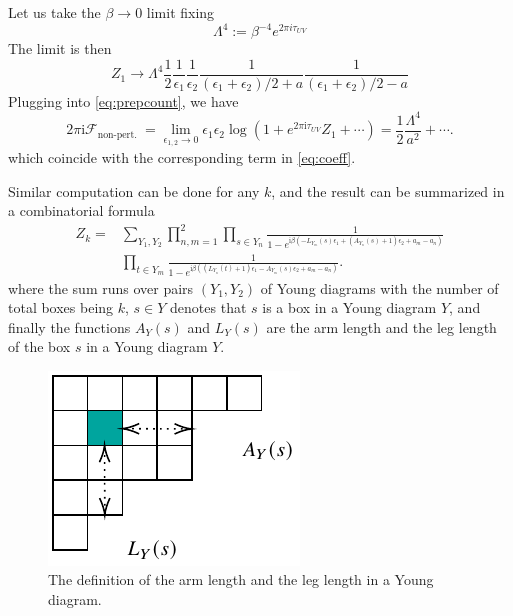 \documentclass{article}
\begin{document}
Let us take the $\beta\to 0$ limit fixing
\begin{equation}
\Lambda^{4}:=\beta^{-4} e^{2 \pi i \tau_{U V}}
\end{equation}
The limit is then
\begin{equation}
Z_{1} \rightarrow \Lambda^{4} \frac{1}{2} \frac{1}{\epsilon_{1}} \frac{1}{\epsilon_{2}} \frac{1}{\left(\epsilon_{1}+\epsilon_{2}\right) / 2+a} \frac{1}{\left(\epsilon_{1}+\epsilon_{2}\right) / 2-a}
\end{equation}
Plugging into \eqref{eq:prepcount}, we have 
\begin{equation}
\label{eq:k1}
2 \pi \mathrm{i} \mathscr{F}_{\text {non-pert. }}=\lim _{\epsilon_{1,2} \rightarrow 0} \epsilon_{1} \epsilon_{2} \log \left(1+e^{2 \pi \mathrm{i} \tau_{U V}} Z_{1}+\cdots\right)=\frac{1}{2} \frac{\Lambda^{4}}{a^{2}}+\cdots .
\end{equation}
which coincide with the corresponding term in \eqref{eq:coeff}. 

Similar computation can be done for any $k$, and the result can be summarized in a combinatorial formula
\begin{equation}
\begin{aligned}
\label{eq:young}
Z_{k}= &\sum_{Y_{1}, Y_{2}} \prod_{n, m=1}^{2} \prod_{s \in Y_{n}} \frac{1}{1-e^{\mathrm{i} \beta\left(-L_{Y_{m}}(s) \epsilon_{1}+\left(A_{Y_{n}}(s)+1\right) \epsilon_{2}+a_{m}-a_{n}\right)}}\\
&\prod_{t \in Y_{m}} \frac{1}{1-e^{\mathrm{i} \beta\left(\left(L_{Y_{n}}(t)+1\right) \epsilon_{1}-A_{Y_{m}}(s) \epsilon_{2}+a_{m}-a_{n}\right)}} .
\end{aligned}
\end{equation}
where the sum runs over pairs $(Y_1,Y_2)$ of Young diagrams with the number of total boxes being $k$, $s \in Y$ denotes that $s$ is a box in a Young diagram $Y$, and finally the functions $A_Y(s)$ and $L_Y(s)$ are the arm length and the leg length of the box $s$ in a Young diagram $Y$.

\begin{figure}[htbp]
\centering
\includegraphics{young.pdf}
\caption{The definition of the arm length and the leg length in a Young diagram.}
\label{fig:young}
\end{figure}
\end{document}
